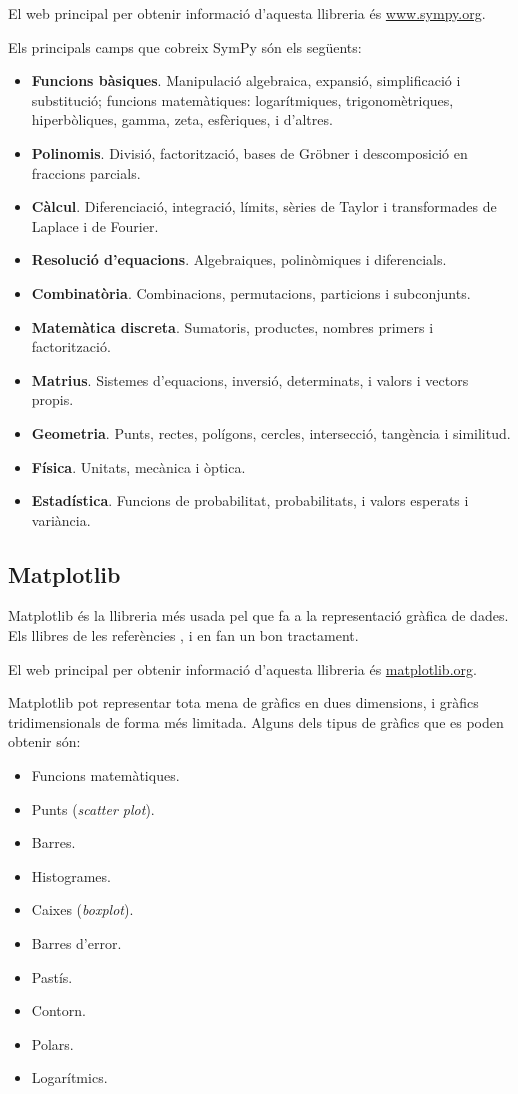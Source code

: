 El  web principal per obtenir informació d'aquesta llibreria és
\href{https://www.sympy.org/en/index.html}{www.sympy.org}.

Els principals camps que cobreix SymPy són els següents:
\begin{itemize}
	\item \textbf{Funcions bàsiques}. Manipulació algebraica, expansió, simplificació i substitució; funcions matemàtiques: logarítmiques, trigonomètriques, hiperbòliques, gamma, zeta, esfèriques,  i d'altres.
	\item \textbf{Polinomis}. Divisió, factorització, 	 bases de Gröbner i descomposició en fraccions parcials.
	\item \textbf{Càlcul}. Diferenciació, integració, límits, sèries de Taylor i transformades de Laplace i de Fourier.
	\item \textbf{Resolució d'equacions}. Algebraiques, polinòmiques i diferencials.
	\item \textbf{Combinatòria}. Combinacions, permutacions, particions i subconjunts.
	\item \textbf{Matemàtica discreta}. Sumatoris, productes, nombres primers i factorització.
	\item \textbf{Matrius}. Sistemes d'equacions, inversió, determinats, i valors i vectors propis.
	\item \textbf{Geometria}. Punts, rectes, polígons, cercles, intersecció, tangència i similitud.
	\item \textbf{Física}. Unitats, mecànica i òptica.
	\item \textbf{Estadística}. Funcions de probabilitat, probabilitats, i valors esperats  i variància.
\end{itemize}


\subsection{Matplotlib}

Matplotlib és la llibreria més usada pel que fa a la representació gràfica de dades. Els llibres de les referències \cite{JOH}, \cite{HIL} i \cite{VAN} en fan un bon tractament.

El  web principal per obtenir informació d'aquesta llibreria és \href{https://matplotlib.org/}{matplotlib.org}.

Matplotlib pot representar tota mena de gràfics en dues dimensions, i gràfics  tridimensionals de forma més limitada. Alguns dels tipus de gràfics que es poden obtenir són:
\begin{itemize}
	\item Funcions matemàtiques.
	\item Punts (\textit{scatter plot}).
	\item Barres.
	\item Histogrames.
	\item Caixes (\textit{boxplot}).
	\item Barres d'error.
	\item Pastís.
	\item Contorn.
	\item Polars.
	\item Logarítmics.
\end{itemize}

